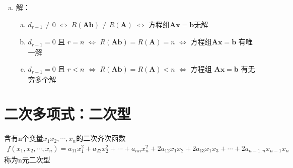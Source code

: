 \documentclass[12pt]{book}
\begin{document}
\begin{enumerate}[1.]
\begin{enumerate}[(1)]
\begin{enumerate}[a.]
\begin{gather*}
\begin{align*}
                                      c_{22} x_{2} + \cdots + c_{2r} x_{r} + \cdots + c_{2n} x_{n} = d_{2}                \\
                                      \vdots                                                                              \\
                                      c_{rr} x_{r} + \cdots + c_{rn} x_{n} = d_{r}                                        \\
                                      0 = d_{r+1}                                                                         \\
                                      0=0                                                                                 \\
                                      \vdots                                                                              \\
                                      0 =0
                                  \end{align*}\right.
                              \end{gather*}
                        \item 解：
                              \begin{enumerate}[(a)]
                                  \item $d_{r+1}\neq 0$ $\Leftrightarrow$ $R(\bm{A b})\neq R(\bm{A})$ $\Leftrightarrow$ 方程组$\bm{A x}=\bm{b}$无解
                                  \item $d_{r+1}=0$ 且 $r=n$ $\Leftrightarrow$ $R(\bm{A b})=R(\bm{A})=n$ $\Leftrightarrow$ 方程组$\bm{A x}=\bm{b}$ 有唯一解
                                  \item $d_{r+1}=0$ 且 $r<n$ $\Leftrightarrow$ $R(\bm{Ab})=R(\bm{A})<n$ $\Leftrightarrow$ 方程组 $\bm{A x}=\bm{b}$ 有无穷多个解
                              \end{enumerate}
                    \end{enumerate}
          \end{enumerate}
\end{enumerate}



\section{二次多项式：二次型}

含有n个变量$x_1x_2,\cdots,x_n$的二次齐次函数
\begin{gather*}
    f(x_1,x_2,\cdots,x_n) = a_{11} x_{1}^{2} + a_{22} x_{2}^{2} +\cdots + a_{nn} x_{n}^{2} + 2 a_{12} x_{1} x_{2} + 2 a_{13} x_{1} x_{3} +\cdots + 2a_{n-1,n} x_{n-1} x_{n}
\end{gather*}
称为n元二次型
\end{document}

